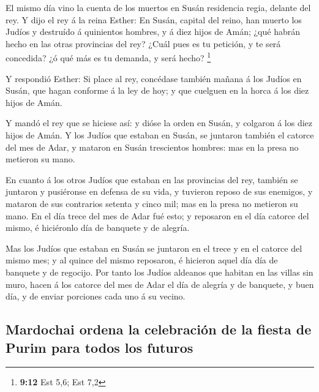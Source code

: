  El mismo día vino la cuenta de los muertos en Susán
residencia regia, delante del rey.  Y dijo el rey á la
reina Esther: En Susán, capital del reino, han muerto los Judíos y
destruído á quinientos hombres, y á diez hijos de Amán; ¿qué habrán
hecho en las otras provincias del rey? ¿Cuál pues es tu petición, y te
será concedida? ¿ó qué más es tu demanda, y será hecho? \footnote{\textbf{9:12}
  Est 5,6; Est 7,2}

 Y respondió Esther: Si place al rey, concédase también
mañana á los Judíos en Susán, que hagan conforme á la ley de hoy; y que
cuelguen en la horca á los diez hijos de Amán.

 Y mandó el rey que se hiciese así: y dióse la orden en
Susán, y colgaron á los diez hijos de Amán.  Y los Judíos
que estaban en Susán, se juntaron también el catorce del mes de Adar, y
mataron en Susán trescientos hombres: mas en la presa no metieron su
mano.

 En cuanto á los otros Judíos que estaban en las provincias
del rey, también se juntaron y pusiéronse en defensa de su vida, y
tuvieron reposo de sus enemigos, y mataron de sus contrarios setenta y
cinco mil; mas en la presa no metieron su mano.  En el día
trece del mes de Adar fué esto; y reposaron en el día catorce del mismo,
é hiciéronlo día de banquete y de alegría.

 Mas los Judíos que estaban en Susán se juntaron en el
trece y en el catorce del mismo mes; y al quince del mismo reposaron, é
hicieron aquel día día de banquete y de regocijo.  Por
tanto los Judíos aldeanos que habitan en las villas sin muro, hacen á
los catorce del mes de Adar el día de alegría y de banquete, y buen día,
y de enviar porciones cada uno á su vecino.

\hypertarget{mardochai-ordena-la-celebraciuxf3n-de-la-fiesta-de-purim-para-todos-los-futuros}{%
\subsection{Mardochai ordena la celebración de la fiesta de Purim para
todos los
futuros}\label{mardochai-ordena-la-celebraciuxf3n-de-la-fiesta-de-purim-para-todos-los-futuros}}

